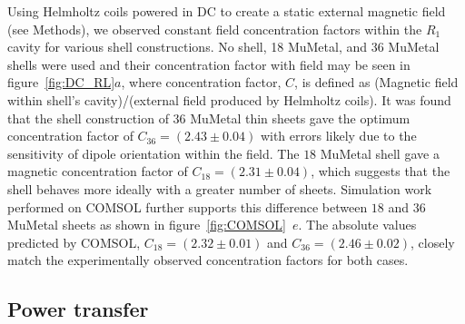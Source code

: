\documentclass[11pt]{iopart}
\begin{document}
Using Helmholtz coils powered in DC to create a static external
magnetic field (see Methods), we observed constant field concentration
factors within the $R_1$ cavity for various shell constructions. No
shell, 18 MuMetal, and 36 MuMetal shells were used and their
concentration factor with field may be seen in
figure~\ref{fig:DC_RL}$a$, where concentration factor, $C$, is defined
as (Magnetic field within shell's cavity)/(external field produced by
Helmholtz coils). It was found that the shell construction of $36$
MuMetal thin sheets gave the optimum concentration factor of $C_{36} =
(2.43\pm0.04)$ with errors likely due to the sensitivity of dipole
orientation within the field. The $18$ MuMetal shell gave a magnetic
concentration factor of $C_{18} = (2.31\pm0.04)$, which suggests that
the shell behaves more ideally with a greater number of
sheets. Simulation work performed on COMSOL further supports this
difference between $18$ and $36$ MuMetal sheets as shown in
figure~\ref{fig:COMSOL}~$e$. The absolute values predicted by COMSOL,
$C_{18}= (2.32\pm0.01)$ and $C_{36} = (2.46\pm0.02)$, closely match
the experimentally observed concentration factors for both cases.

\subsection{Power transfer}
\end{document}
